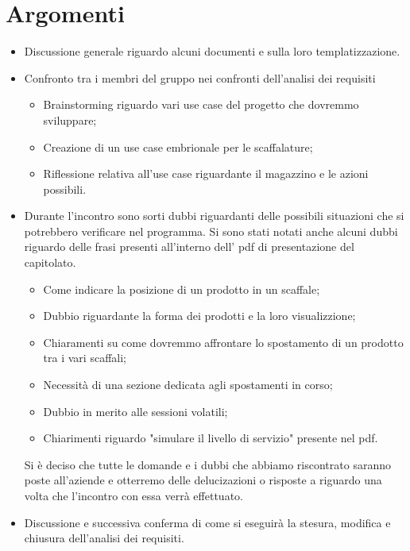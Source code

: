\section{Argomenti}
    \begin{itemize}
        \item Discussione generale riguardo alcuni documenti e sulla loro templatizzazione.        
        \item Confronto tra i membri del gruppo nei confronti dell'analisi dei requisiti
            \begin{itemize}
                \item Brainstorming riguardo vari use case del progetto che dovremmo sviluppare;
                \item Creazione di un use case embrionale per le scaffalature;
                \item Riflessione relativa all'use case riguardante il magazzino e le azioni possibili.
            \end{itemize}
        \item Durante l'incontro sono sorti dubbi riguardanti delle possibili situazioni che si potrebbero verificare nel programma. Si sono stati notati anche alcuni dubbi riguardo delle frasi presenti all'interno dell' pdf di presentazione del capitolato.
            \begin{itemize}
                \item Come indicare la posizione di un prodotto in un scaffale;
                \item Dubbio riguardante la forma dei prodotti e la loro visualizzione;
                \item Chiaramenti su come dovremmo affrontare lo spostamento di un prodotto tra i vari scaffali;
                \item Necessità di una sezione dedicata agli spostamenti in corso;
                \item Dubbio in merito alle sessioni volatili;
                \item Chiarimenti riguardo "simulare il livello di servizio" presente nel pdf.
            \end{itemize}
        Si è deciso che tutte le domande e i dubbi che abbiamo riscontrato saranno poste all'aziende e otterremo delle delucizazioni o risposte a riguardo una volta che l'incontro con essa verrà effettuato.\\
        \item Discussione e successiva conferma di come si eseguirà la stesura, modifica e chiusura dell'analisi dei requisiti.
    \end{itemize}